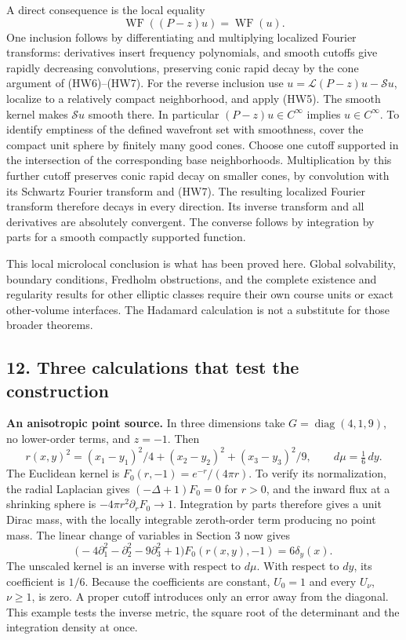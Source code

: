 \documentclass[
  11pt,
]{article}
\begin{document}
A direct consequence is the local equality \[
                 \operatorname{WF}((P-z)u)=\operatorname{WF}(u).
                                                               \tag{HC7}
\] One inclusion follows by differentiating and multiplying localized
Fourier transforms: derivatives insert frequency polynomials, and smooth
cutoffs give rapidly decreasing convolutions, preserving conic rapid
decay by the cone argument of (HW6)--(HW7). For the reverse inclusion
use \(u=\mathcal L(P-z)u-\mathcal S u\), localize to a relatively
compact neighborhood, and apply (HW5). The smooth kernel makes
\(\mathcal S u\) smooth there. In particular \((P-z)u\in C^\infty\)
implies \(u\in C^\infty\). To identify emptiness of the defined
wavefront set with smoothness, cover the compact unit sphere by finitely
many good cones. Choose one cutoff supported in the intersection of the
corresponding base neighborhoods. Multiplication by this further cutoff
preserves conic rapid decay on smaller cones, by convolution with its
Schwartz Fourier transform and (HW7). The resulting localized Fourier
transform therefore decays in every direction. Its inverse transform and
all derivatives are absolutely convergent. The converse follows by
integration by parts for a smooth compactly supported function.

This local microlocal conclusion is what has been proved here. Global
solvability, boundary conditions, Fredholm obstructions, and the
complete existence and regularity results for other elliptic classes
require their own course units or exact other-volume interfaces. The
Hadamard calculation is not a substitute for those broader theorems.

\subsection{12. Three calculations that test the
construction}\label{three-calculations-that-test-the-construction}

\textbf{An anisotropic point source.} In three dimensions take
\(G=\operatorname{diag}(4,1,9)\), no lower-order terms, and \(z=-1\).
Then \[
 r(x,y)^2=(x_1-y_1)^2/4+(x_2-y_2)^2+(x_3-y_3)^2/9,
 \qquad d\mu=\tfrac16\,dy.                                    \tag{HE1}
\] The Euclidean kernel is \(F_0(r,-1)=e^{-r}/(4\pi r)\). To verify its
normalization, the radial Laplacian gives \((-\Delta+1)F_0=0\) for
\(r>0\), and the inward flux at a shrinking sphere is
\(-4\pi r^2\partial_rF_0\to1\). Integration by parts therefore gives a
unit Dirac mass, with the locally integrable zeroth-order term producing
no point mass. The linear change of variables in Section 3 now gives \[
 \bigl(-4\partial_1^2-\partial_2^2-9\partial_3^2+1\bigr)
               F_0(r(x,y),-1)=6\delta_y(x).                   \tag{HE2}
\] The unscaled kernel is an inverse with respect to \(d\mu\). With
respect to \(dy\), its coefficient is \(1/6\). Because the coefficients
are constant, \(U_0=1\) and every \(U_\nu\), \(\nu\geq1\), is zero. A
proper cutoff introduces only an error away from the diagonal. This
example tests the inverse metric, the square root of the determinant and
the integration density at once.
\end{document}
